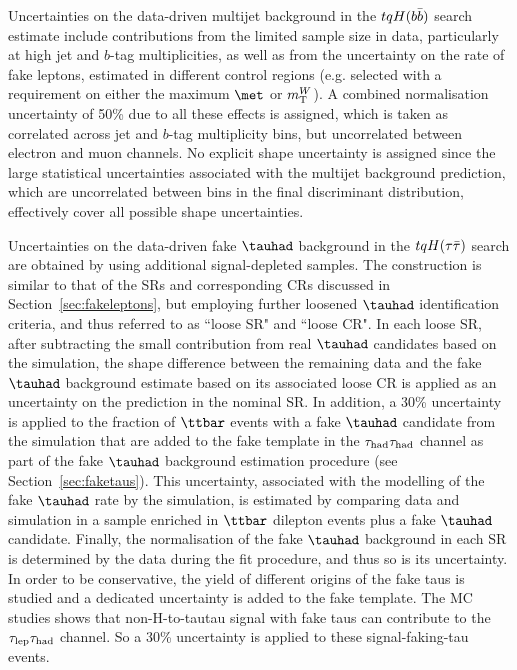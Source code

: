Uncertainties on the data-driven multijet background in the $tqH(b\bar{b})$ search estimate include
contributions from the limited sample size in data, particularly at high jet and $b$-tag multiplicities, as 
well as from the uncertainty on the rate of fake leptons, estimated in 
different control regions (e.g. selected with a requirement on either the maximum $\met$ or $m_{\mathrm T}^W$). 
A combined normalisation uncertainty of 50\% due 
to all these effects is assigned, which is taken as correlated across jet
and $b$-tag multiplicity bins, but uncorrelated between electron and muon channels. 
No explicit shape uncertainty is assigned since the large statistical uncertainties associated with
the multijet background prediction, which are uncorrelated 
between bins in the final discriminant distribution, effectively cover all possible shape uncertainties. 

Uncertainties on the data-driven fake $\tauhad$ background in the $tqH(\tau\bar{\tau})$ search are obtained by using additional signal-depleted samples. The construction is similar to that of the SRs and corresponding CRs discussed in Section~\ref{sec:fakeleptons}, but employing further loosened $\tauhad$ identification criteria, and thus referred to as ``loose SR"  and ``loose CR". 
In each loose SR, after subtracting the small contribution from real $\tauhad$ candidates based on the simulation, 
the shape difference between the remaining data and the fake $\tauhad$ background estimate based on its associated loose CR 
is applied as an uncertainty on the prediction in the nominal SR.
In addition, a 30\% uncertainty is applied to the fraction of $\ttbar$ events with a fake $\tauhad$ candidate from the simulation that are added to the fake template in the $\tau_{\mathrm{had}} \tau_{\mathrm{had}}$ channel as part of the fake $\tauhad$ background estimation procedure (see Section~\ref{sec:faketaus}). This uncertainty, associated with the modelling of the fake $\tauhad$ rate by the simulation, is estimated by comparing data and simulation in a sample enriched in $\ttbar$ dilepton events plus a fake $\tauhad$ candidate. Finally, the normalisation of the fake $\tauhad$ background in each SR is determined by the data during the fit procedure, and thus so is its uncertainty. In order to be conservative, the yield of different origins of the fake taus is studied and a dedicated uncertainty is added to the fake template. The MC studies shows that non-H-to-tautau signal with fake taus can contribute to the $\tau_{\mathrm{lep}} \tau_{\mathrm{had}}$ channel. So a 30\% uncertainty is  applied to these signal-faking-tau events.

